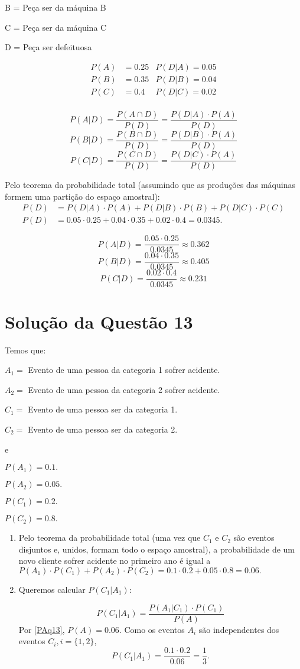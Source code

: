 \documentclass[
	12pt,				%
	openright,			%
	twoside,			%
	a4paper,			%
	english,			%
	french,				%
	spanish,			%
	brazil,				%
	]{abntex2}
\begin{document}
B = Peça ser da máquina B

C = Peça ser da máquina C

D = Peça ser defeituosa

\begin{align*}
    P(A) &= 0.25 & P(D|A) = 0.05\\
    P(B) &= 0.35 & P(D|B) = 0.04\\
    P(C) &= 0.4 & P(D|C) = 0.02\\
\end{align*}

    $$P(A|D) = \frac{P(A\cap D)}{P(D)} = \frac{P(D|A)\cdot P(A)}{P(D)}$$
    $$P(B|D) = \frac{P(B\cap D)}{P(D)} = \frac{P(D|B)\cdot P(A)}{P(D)}$$
    $$P(C|D) = \frac{P(C\cap D)}{P(D)} = \frac{P(D|C)\cdot P(A)}{P(D)}$$

Pelo teorema da probabilidade total (assumindo que as produções das máquinas formem uma partição do espaço amostral):
\begin{align*}
    P(D) &= P(D|A)\cdot P(A) + P(D|B)\cdot P(B) + P(D|C)\cdot P(C)\\
    P(D) &= 0.05\cdot0.25 + 0.04\cdot0.35 + 0.02\cdot0.4 = 0.0345.
\end{align*}

$$P(A|D) = \frac{0.05\cdot0.25}{0.0345} \approx 0.362$$
$$P(B|D) = \frac{0.04\cdot0.35}{0.0345} \approx 0.405$$
$$P(C|D) = \frac{0.02\cdot0.4}{0.0345} \approx 0.231$$

\section{Solução da Questão 13}
Temos que:

$A_1 =$ Evento de uma pessoa da categoria 1 sofrer acidente.

$A_2 =$ Evento de uma pessoa da categoria 2 sofrer acidente.

$C_1 =$ Evento de uma pessoa ser da categoria 1.

$C_2 =$ Evento de uma pessoa ser da categoria 2.

e

$P(A_1) = 0.1.$

$P(A_2) = 0.05.$

$P(C_1) = 0.2.$

$P(C_2) = 0.8.$

\begin{enumerate}[label=\alph*)]
    \item \label{PAq13} Pelo teorema da probabilidade total (uma vez que $C_1$ e $C_2$ são eventos disjuntos e, unidos, formam todo o espaço amostral), a probabilidade de um novo cliente sofrer acidente no primeiro ano é igual a $P(A_1) \cdot P(C_1) + P(A_2) \cdot P(C_2) = 0.1 \cdot 0.2 + 0.05 \cdot 0.8 = 0.06.$
    
    \item Queremos calcular $P(C_1|A_1)$:
    
    $$P(C_1|A_1) = \frac{P(A_1|C_1) \cdot P(C_1)}{P(A)}$$
    Por \ref{PAq13}, $P(A) = 0.06$. Como os eventos $A_i$ são independentes dos eventos $C_i, i = \{1, 2\}$,
    $$P(C_1|A_1) = \frac{0.1 \cdot 0.2}{0.06} = \frac{1}{3}.$$
\end{enumerate}
\end{document}
